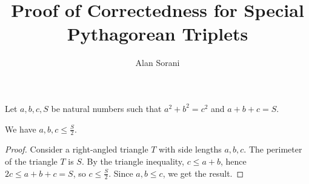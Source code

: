 \documentclass[10pt]{article}
\author{Alan Sorani}
\title{Proof of Correctedness for Special Pythagorean Triplets}
\begin{document}
\maketitle

\begin{theorem}
Let $a,b,c,S$ be natural numbers such that $a^2 + b^2 = c^2$ and $a+b+c=S$.

We have $a,b,c \leq \frac{S}{2}$.
\end{theorem}

\begin{proof}
Consider a right-angled triangle $T$ with side lengths $a,b,c$. The perimeter of the triangle $T$ is $S$. By the triangle inequality, $c \leq a + b$, hence $2c \leq a + b + c = S$, so $c \leq \frac{S}{2}$. Since $a,b \leq c$, we get the result.
\end{proof}

\printbibliography
\end{document}
